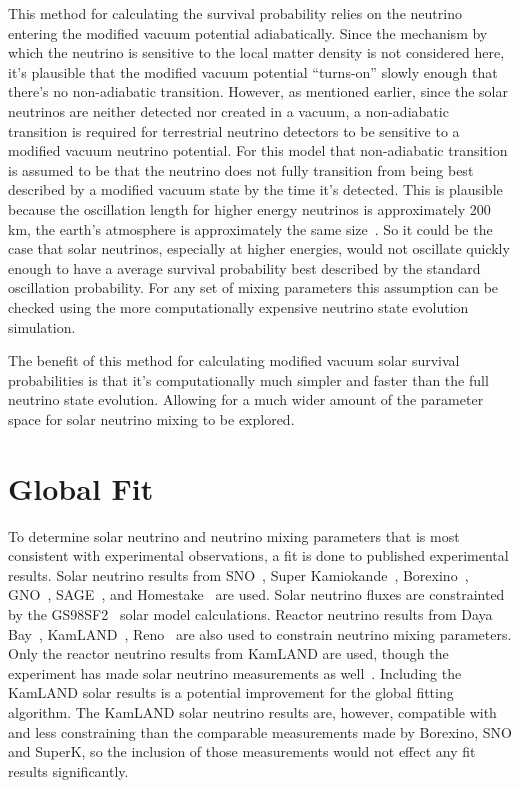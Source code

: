 This method for calculating the survival probability relies
on the neutrino entering the modified vacuum potential adiabatically.
Since the mechanism by which the neutrino is sensitive to the local matter
density is not considered here, it's plausible that the modified
vacuum potential ``turns-on'' slowly enough that there's no non-adiabatic
transition.
However, as mentioned earlier, since the solar neutrinos are neither
detected nor created in a vacuum, a non-adiabatic transition is required
for terrestrial neutrino detectors to be sensitive to a modified vacuum
neutrino potential.
For this model that non-adiabatic transition is assumed to be that the
neutrino does not fully transition from being best described
by a modified vacuum state by the time it's detected.
This is plausible because the oscillation length for higher
energy neutrinos is approximately 200\,km, the earth's atmosphere
is approximately the same size~\cite{atmosphere_profile}.
So it could be the case that solar neutrinos, especially at higher
energies, would not oscillate quickly enough to have a average
survival probability best described by the standard oscillation
probability.
For any set of mixing parameters this assumption can be checked using the
more computationally expensive neutrino state evolution simulation.

The benefit of this method for calculating modified vacuum solar survival
probabilities is that it's computationally much simpler and faster than the full
neutrino state evolution.
Allowing for a much wider amount of the parameter space for solar neutrino
mixing to be explored.

\section{Global Fit}
To determine solar neutrino and neutrino mixing parameters that is most
consistent with experimental observations, a fit is done to published
experimental results.
Solar neutrino results from SNO~\cite{sno_combined}, Super
Kamiokande~\cite{superk4, superk_first_solar,superk2, superk3},
Borexino~\cite{borexino_final_results,borexino_nature}, GNO~\cite{gallex, gno},
SAGE~\cite{sage}, and Homestake~\cite{homestake} are used.
Solar neutrino fluxes are constrainted by the GS98SF2~\cite{XXX} solar model calculations.
Reactor neutrino results from Daya Bay~\cite{}, KamLAND~\cite{}, Reno~\cite{}
are also used to constrain neutrino mixing parameters.
Only the reactor neutrino results from KamLAND are used, though
the experiment has made solar neutrino measurements as well~\cite{kamland_solar, kamland_b8}.
Including the KamLAND solar results is a potential improvement for the global fitting
algorithm. The KamLAND solar neutrino results are, however, compatible
with and less constraining than the comparable measurements made by Borexino, SNO and SuperK,
so the inclusion of those measurements would not effect any fit results significantly.


